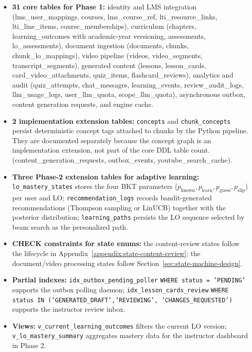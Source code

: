 \begin{itemize}
    \item \textbf{31 core tables for Phase 1:} identity and LMS integration
          (lms\_user\_mappings, courses, lms\_course\_ref,
          lti\_resource\_links, lti\_line\_items, course\_memberships),
          curriculum (chapters, learning\_outcomes with academic-year
          versioning, assessments, lo\_assessments), document
          ingestion (documents, chunks, chunk\_lo\_mappings), video
          pipeline (videos, video\_segments, transcript\_segments),
          generated content (lessons, lesson\_cards,
          card\_video\_attachments, quiz\_items, flashcard\_reviews),
          analytics and audit (quiz\_attempts, chat\_messages,
          learning\_events, review\_audit\_logs, llm\_usage\_logs,
          user\_llm\_quota, scope\_llm\_quota), asynchronous outbox,
          content generation requests, and engine cache.
    \item \textbf{2 implementation extension tables:}
          \texttt{concepts} and \texttt{chunk\_concepts} persist
          deterministic concept tags attached to chunks by the Python
          pipeline. They are documented separately because the concept
          graph is an implementation extension, not part of the core DDL
          table count.
          (content\_generation\_requests, outbox\_events,
          youtube\_search\_cache).
    \item \textbf{Three Phase-2 extension tables for adaptive learning:}
          \texttt{lo\_mastery\_states} stores the four BKT parameters
          ($p_{\text{known}}, p_{\text{learn}}, p_{\text{guess}},
          p_{\text{slip}}$) per user and LO;
          \texttt{recommendation\_logs} records bandit-generated
          recommendations (Thompson sampling or LinUCB) together with the
          posterior distribution; \texttt{learning\_paths} persists the LO
          sequence selected by beam search as the personalized path.
    \item \textbf{CHECK constraints for state enums:} the content-review
          states follow the lifecycle in
          Appendix~\ref{appendix:state-content-review}; the document/video
          processing states follow Section~\ref{sec:state-machine-design}.
    \item \textbf{Partial indexes:} \texttt{idx\_outbox\_pending\_poller}
          \texttt{WHERE status = 'PENDING'} supports the outbox polling
          daemon; \texttt{idx\_lesson\_cards\_review}
          \texttt{WHERE status IN ('GENERATED\_DRAFT','REVIEWING',
          'CHANGES\_REQUESTED')} supports the instructor review inbox.
    \item \textbf{Views:} \texttt{v\_current\_learning\_outcomes} filters the
          current LO version; \texttt{v\_lo\_mastery\_summary} aggregates
          mastery data for the instructor dashboard in Phase 2.
\end{itemize}

